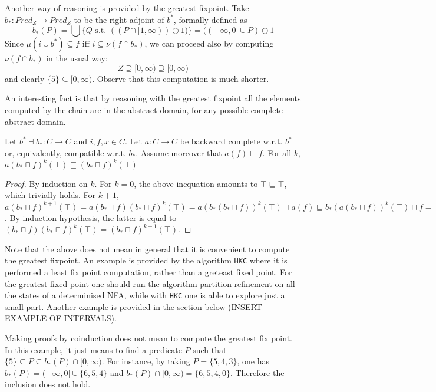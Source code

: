 \documentclass{llncs}
\begin{document}
\medskip

Another way of reasoning is provided by the greatest fixpoint. Take $b_*\colon Pred_Z\to Pred_Z$ to be the right adjoint of $b^*$, formally defined as 
$$b_*(P) = \bigcup \{Q \text{ s.t. } ( (P\cap [1,\infty) ) \ominus 1 ) \} = ( (-\infty,0]\cup P) \oplus1$$ 
Since $\mu (i \cup b^*)\subseteq f$ iff $i \subseteq \nu (f \cap b_*)$, we can proceed also by computing $\nu (f \cap b_*)$ in the usual way:
\begin{equation*}
Z \supseteq [0,\infty)  \supseteq [0,\infty) 
\end{equation*}
and clearly $\{5\} \subseteq [0,\infty)$.
Observe that this computation is much shorter. 

An interesting fact is that by reasoning with the greatest fixpoint all the elements computed by the chain are in the abstract domain, for any possible complete abstract domain.
%
\begin{proposition}
Let $b^* \dashv b_* \colon C \to C$ and $i,f,x\in C$. Let $a\colon C\to C$ be backward complete w.r.t. $b^*$ or, equivalently, compatible w.r.t. $b_*$. Assume moreover that $a(f)\sqsubseteq f$. For all $k$, $a(b_*\sqcap f)^k(\top) \sqsubseteq (b_*\sqcap f)^k(\top)$
\end{proposition}
\begin{proof}
By induction on $k$. For $k=0$, the above inequation amounts to  $\top \sqsubseteq \top$, which trivially holds.
For $k+1$, $a(b_*\sqcap f)^{k+1}(\top)=a(b_*\sqcap f)(b_*\sqcap f)^k(\top) = a(b_*(b_*\sqcap f))^k(\top) \sqcap a(f) \sqsubseteq b_*(a(b_*\sqcap f))^k(\top) \sqcap f = (b_*\sqcap f)(a(b_*\sqcap f))^k(\top)$. By induction hypothesis, the latter is equal to $(b_*\sqcap f)(b_*\sqcap f)^k(\top)=(b_*\sqcap f)^{k+1}(\top)$.
\end{proof}

Note that the above does not mean in general that it is convenient to compute the greatest fixpoint. An example is provided by the algorithm \texttt{HKC} where it is performed a least fix point computation, rather than a greteast fixed point. For the greatest fixed point one should run the algorithm partition refinement on all the states of a determinised NFA, while with \texttt{HKC} one is able to explore just a small part. Another example is provided in the section below (INSERT EXAMPLE OF INTERVALS).

\medskip

Making proofs by coinduction does not mean to compute the greatest fix point. In this example, it just means to find a predicate $P$ such that $\{5\} \subseteq P \subseteq b_*(P) \cap [0,\infty)$. For instance, by taking $P = \{5,4,3\}$, one has $b_*(P) = (-\infty,0] \cup \{6,5,4\}$ and $b_*(P) \cap [0,\infty) = \{6,5,4,0\}$. Therefore the inclusion does not hold.
\end{document}
